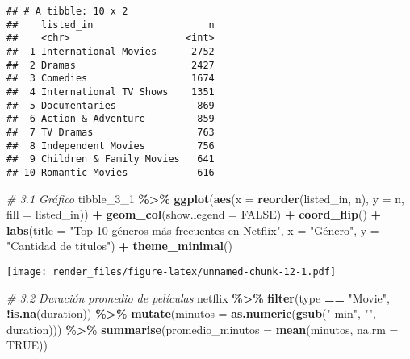 \documentclass[
]{article}
\newenvironment{Shaded}{\begin{snugshade}}{\end{snugshade}}
\newcommand{\AttributeTok}[1]{\textcolor[rgb]{0.13,0.29,0.53}{#1}}
\newcommand{\CommentTok}[1]{\textcolor[rgb]{0.56,0.35,0.01}{\textit{#1}}}
\newcommand{\ConstantTok}[1]{\textcolor[rgb]{0.56,0.35,0.01}{#1}}
\newcommand{\FunctionTok}[1]{\textcolor[rgb]{0.13,0.29,0.53}{\textbf{#1}}}
\newcommand{\NormalTok}[1]{#1}
\newcommand{\SpecialCharTok}[1]{\textcolor[rgb]{0.81,0.36,0.00}{\textbf{#1}}}
\newcommand{\StringTok}[1]{\textcolor[rgb]{0.31,0.60,0.02}{#1}}
\begin{document}
\begin{verbatim}
## # A tibble: 10 x 2
##    listed_in                    n
##    <chr>                    <int>
##  1 International Movies      2752
##  2 Dramas                    2427
##  3 Comedies                  1674
##  4 International TV Shows    1351
##  5 Documentaries              869
##  6 Action & Adventure         859
##  7 TV Dramas                  763
##  8 Independent Movies         756
##  9 Children & Family Movies   641
## 10 Romantic Movies            616
\end{verbatim}

\begin{Shaded}
\begin{Highlighting}[]
\CommentTok{\# 3.1 Gráfico}
\NormalTok{tibble\_3\_1 }\SpecialCharTok{\%\textgreater{}\%}
  \FunctionTok{ggplot}\NormalTok{(}\FunctionTok{aes}\NormalTok{(}\AttributeTok{x =} \FunctionTok{reorder}\NormalTok{(listed\_in, n), }\AttributeTok{y =}\NormalTok{ n, }\AttributeTok{fill =}\NormalTok{ listed\_in)) }\SpecialCharTok{+}
  \FunctionTok{geom\_col}\NormalTok{(}\AttributeTok{show.legend =} \ConstantTok{FALSE}\NormalTok{) }\SpecialCharTok{+}
  \FunctionTok{coord\_flip}\NormalTok{() }\SpecialCharTok{+}
  \FunctionTok{labs}\NormalTok{(}\AttributeTok{title =} \StringTok{"Top 10 géneros más frecuentes en Netflix"}\NormalTok{,}
       \AttributeTok{x =} \StringTok{"Género"}\NormalTok{, }\AttributeTok{y =} \StringTok{"Cantidad de títulos"}\NormalTok{) }\SpecialCharTok{+}
  \FunctionTok{theme\_minimal}\NormalTok{()}
\end{Highlighting}
\end{Shaded}

\texttt{[image: render\_files/figure-latex/unnamed-chunk-12-1.pdf]}

\begin{Shaded}
\begin{Highlighting}[]
\CommentTok{\# 3.2 Duración promedio de películas}
\NormalTok{netflix }\SpecialCharTok{\%\textgreater{}\%}
  \FunctionTok{filter}\NormalTok{(type }\SpecialCharTok{==} \StringTok{"Movie"}\NormalTok{, }\SpecialCharTok{!}\FunctionTok{is.na}\NormalTok{(duration)) }\SpecialCharTok{\%\textgreater{}\%}
  \FunctionTok{mutate}\NormalTok{(}\AttributeTok{minutos =} \FunctionTok{as.numeric}\NormalTok{(}\FunctionTok{gsub}\NormalTok{(}\StringTok{" min"}\NormalTok{, }\StringTok{""}\NormalTok{, duration))) }\SpecialCharTok{\%\textgreater{}\%}
  \FunctionTok{summarise}\NormalTok{(}\AttributeTok{promedio\_minutos =} \FunctionTok{mean}\NormalTok{(minutos, }\AttributeTok{na.rm =} \ConstantTok{TRUE}\NormalTok{))}
\end{Highlighting}
\end{Shaded}
\end{document}
